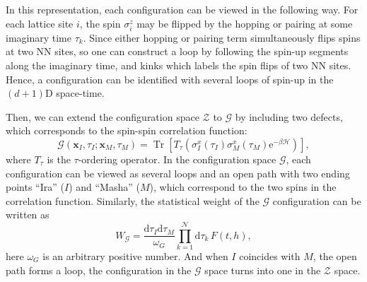 \documentclass{article}
\DeclareMathOperator{\Tr}{Tr}
\theoremstyle{plain} \newtheorem{thm}{Theorem}[section]
\theoremstyle{definition} \newtheorem{df}{Definition}[section]
\theoremstyle{definition} \newtheorem{eg}{Example}
\theoremstyle{remark} \newtheorem*{rmk}{Remark}
\begin{document}
In this representation, each configuration can be viewed in the following way. For each lattice site $i$, the spin $\sigma_i^z$ may be flipped by the hopping or pairing at some imaginary time $\tau_k$. Since either hopping or pairing term simultaneously flips spins at two NN sites, so one can construct a loop by following the spin-up segments along the imaginary time, and kinks which labels the spin flips of two NN sites. Hence, a configuration can be identified with several loops of spin-up in the $(d+1)$D space-time.

Then, we can extend the configuration space $\mathcal{Z}$ to $\mathcal{G}$ by including two defects, which corresponds to the spin-spin correlation function:
\begin{equation}
  \mathcal{G}(\bm{x}_I, \tau_I; \bm{x}_M, \tau_M) = \Tr\left[ T_\tau\left( \sigma_I^x(\tau_I)\sigma_M^x(\tau_M)\mathrm{e}^{-\beta\mathcal{H}} \right) \right],
\end{equation}
where $T_\tau$ is the $\tau$-ordering operator. In the configuration space $\mathcal{G}$, each configuration can be viewed as several loops and an open path with two ending points ``Ira'' ($I$) and ``Masha'' ($M$), which correspond to the two spins in the correlation function. Similarly, the statistical weight of the $\mathcal{G}$ configuration can be written as
\begin{equation}
  W_\mathcal{G} = \frac{\mathrm{d}\tau_I\mathrm{d}\tau_M}{\omega_G} \prod_{k=1}^{\mathcal{N}}\mathrm{d}\tau_k\,F(t, h),
\end{equation}
here $\omega_G$ is an arbitrary positive number. And when $I$ coincides with $M$, the open path forms a loop, the configuration in the $\mathcal{G}$ space turns into one in the $\mathcal{Z}$ space.
\end{document}
